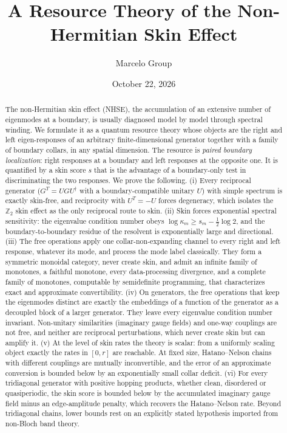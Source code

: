 \documentclass[11pt]{article}
\title{A Resource Theory of the Non-Hermitian Skin Effect}
\author{Marcelo Group}
\date{October 22, 2026}
\theoremstyle{definition}
\theoremstyle{remark}
\begin{document}
\maketitle

\begin{abstract}
The non-Hermitian skin effect (NHSE), the accumulation of an extensive number of eigenmodes at a boundary, is usually diagnosed model by model through spectral winding. We formulate it as a quantum resource theory whose objects are the right and left eigen-responses of an arbitrary finite-dimensional generator together with a family of boundary collars, in any spatial dimension. The resource is \emph{paired boundary localization}: right responses at a boundary and left responses at the opposite one. It is quantified by a skin score $s$ that is the advantage of a boundary-only test in discriminating the two responses. We prove the following.
(i) Every reciprocal generator ($G^{T}=UGU^\dagger$ with a boundary-compatible unitary $U$) with simple spectrum is exactly skin-free, and reciprocity with $U^{T}=-U$ forces degeneracy, which isolates the $\mathbb Z_2$ skin effect as the only reciprocal route to skin.
(ii) Skin forces exponential spectral sensitivity: the eigenvalue condition number obeys $\log\kappa_m\ge s_m-\tfrac12\log2$, and the boundary-to-boundary residue of the resolvent is exponentially large and directional.
(iii) The free operations apply one collar-non-expanding channel to every right and left response, whatever its mode, and process the mode label classically. They form a symmetric monoidal category, never create skin, and admit an infinite family of monotones, a faithful monotone, every data-processing divergence, and a complete family of monotones, computable by semidefinite programming, that characterizes exact and approximate convertibility.
(iv) On generators, the free operations that keep the eigenmodes distinct are exactly the embeddings of a function of the generator as a decoupled block of a larger generator. They leave every eigenvalue condition number invariant. Non-unitary similarities (imaginary gauge fields) and one-way couplings are not free, and neither are reciprocal perturbations, which never create skin but can amplify it.
(v) At the level of skin rates the theory is scalar: from a uniformly scaling object exactly the rates in $[0,r]$ are reachable. At fixed size, Hatano--Nelson chains with different couplings are mutually inconvertible, and the error of an approximate conversion is bounded below by an exponentially small collar deficit.
(vi) For every tridiagonal generator with positive hopping products, whether clean, disordered or quasiperiodic, the skin score is bounded below by the accumulated imaginary gauge field minus an edge-amplitude penalty, which recovers the Hatano--Nelson rate. Beyond tridiagonal chains, lower bounds rest on an explicitly stated hypothesis imported from non-Bloch band theory.
\end{abstract}
\end{document}
